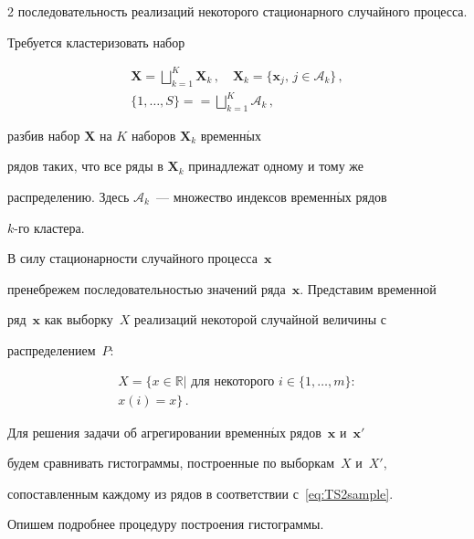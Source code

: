 \begin{multicols}{2}
последовательность реализаций некоторого стационарного случайного процесса.

Требуется кластеризовать набор

\begin{multline}

\label{eq:clastering}

\mathbf{X} = \bigsqcup\limits_{k = 1}^{K} \mathbf{X}_k\,,\quad

\mathbf{X}_k = \{\mathbf{x}_j,\,j\in \mathcal{A}_k\}\,,\\

\{1,\dots , S\} =

= \bigsqcup\limits_{k=1}^{K} \mathcal{A}_k\,,

\end{multline}

разбив набор $\mathbf{X}$ на $K$ наборов $\mathbf{X}_k$ временн$\acute{\mbox{ы}}$х

рядов таких, что все ряды в $\mathbf{X}_k$ принадлежат одному и тому же

распределению. Здесь $\mathcal{A}_k$~--- множество индексов временн$\acute{\mbox{ы}}$х рядов

$k$-го кластера.



В силу стационарности случайного процесса~$\mathbf{x}$

пренебрежем последовательностью значений ряда~$\mathbf{x}$. Представим временной

ряд~$\mathbf{x}$ как выборку~$X$ реализаций некоторой случайной величины с

распределением~$P$:

\begin{multline}

\label{eq:TS2sample}

X = \{x\in\mathbb{R} | \mbox{~для некоторого\ } i\in\{1, \dots, m\}:\\

 x(i) = x\}\,.

\end{multline}

 Для решения задачи об агрегировании временн$\acute{\mbox{ы}}$х рядов~$\mathbf{x}$ и~$\mathbf{x}'$

 будем сравнивать гистограммы, построенные по выборкам~$X$ и~$X'$,

 сопоставленным каждому из рядов в соответствии с~\eqref{eq:TS2sample}.

 Опишем подробнее процедуру построения гистограммы.




\end{multicols}
